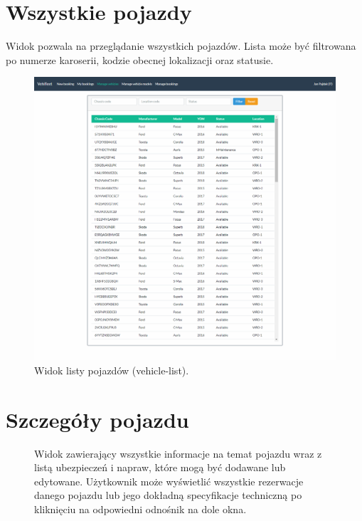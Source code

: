 \documentclass[eng,printmode,openany]{mgr}
\begin{document}
\begin{appendices}
		\section{Wszystkie pojazdy}
		Widok pozwala na przeglądanie wszystkich pojazdów. Lista może być filtrowana po numerze karoserii, kodzie obecnej lokalizacji oraz statusie.
		\begin{figure}[H]
			\centering
			\includegraphics[width=\textwidth]{images/views/vehicle-list.png}
			\caption{Widok listy pojazdów (vehicle-list).}
		\end{figure}
		
		\newpage
		\section{Szczegóły pojazdu}	
		\begin{figure}[H]
			Widok zawierający wszystkie informacje na temat pojazdu wraz z listą ubezpieczeń i napraw, które mogą być dodawane lub edytowane. Użytkownik może wyświetlić wszystkie rezerwacje danego pojazdu lub jego dokładną specyfikacje techniczną po kliknięciu na odpowiedni odnośnik na dole okna.
			

\end{figure}
\end{appendices}
\end{document}
